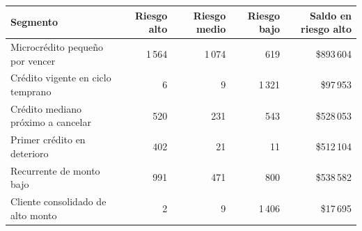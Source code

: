 \begin{tabular}{@{}p{4.6cm}rrrr@{}}
\toprule
\textbf{Segmento} & \textbf{Riesgo alto} & \textbf{Riesgo medio} & \textbf{Riesgo bajo} & \textbf{Saldo en riesgo alto} \\
\midrule
Microcrédito pequeño por vencer & 1\,564 & 1\,074 & 619 & \$893\,604 \\
Crédito vigente en ciclo temprano & 6 & 9 & 1\,321 & \$97\,953 \\
Crédito mediano próximo a cancelar & 520 & 231 & 543 & \$528\,053 \\
Primer crédito en deterioro & 402 & 21 & 11 & \$512\,104 \\
Recurrente de monto bajo & 991 & 471 & 800 & \$538\,582 \\
Cliente consolidado de alto monto & 2 & 9 & 1\,406 & \$17\,695 \\
\bottomrule
\end{tabular}